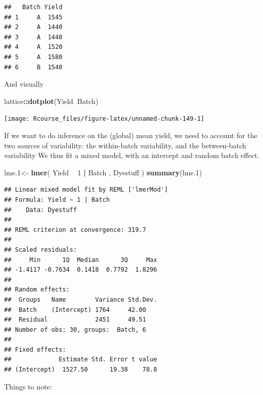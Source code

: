 \documentclass[]{book}
\newenvironment{Shaded}{\begin{snugshade}}{\end{snugshade}}
\newcommand{\KeywordTok}[1]{\textcolor[rgb]{0.13,0.29,0.53}{\textbf{#1}}}
\newcommand{\DecValTok}[1]{\textcolor[rgb]{0.00,0.00,0.81}{#1}}
\newcommand{\StringTok}[1]{\textcolor[rgb]{0.31,0.60,0.02}{#1}}
\newcommand{\OperatorTok}[1]{\textcolor[rgb]{0.81,0.36,0.00}{\textbf{#1}}}
\newcommand{\NormalTok}[1]{#1}
\theoremstyle{definition}
\theoremstyle{definition}
\theoremstyle{definition}
\theoremstyle{remark}
\begin{document}
\begin{verbatim}
##   Batch Yield
## 1     A  1545
## 2     A  1440
## 3     A  1440
## 4     A  1520
## 5     A  1580
## 6     B  1540
\end{verbatim}

And visually

\begin{Shaded}
\begin{Highlighting}[]
\NormalTok{lattice}\OperatorTok{::}\KeywordTok{dotplot}\NormalTok{(Yield}\OperatorTok{~}\NormalTok{Batch)}
\end{Highlighting}
\end{Shaded}

\texttt{[image: Rcourse\_files/figure-latex/unnamed-chunk-149-1]}

If we want to do inference on the (global) mean yield, we need to
account for the two sources of variability: the within-batch
variability, and the between-batch variability We thus fit a mixed
model, with an intercept and random batch effect.

\begin{Shaded}
\begin{Highlighting}[]
\NormalTok{lme.}\DecValTok{1}\NormalTok{<-}\StringTok{ }\KeywordTok{lmer}\NormalTok{( Yield }\OperatorTok{~}\StringTok{ }\DecValTok{1}  \OperatorTok{|}\StringTok{ }\NormalTok{Batch  , Dyestuff )}
\KeywordTok{summary}\NormalTok{(lme.}\DecValTok{1}\NormalTok{)}
\end{Highlighting}
\end{Shaded}

\begin{verbatim}
## Linear mixed model fit by REML ['lmerMod']
## Formula: Yield ~ 1 | Batch
##    Data: Dyestuff
## 
## REML criterion at convergence: 319.7
## 
## Scaled residuals: 
##     Min      1Q  Median      3Q     Max 
## -1.4117 -0.7634  0.1418  0.7792  1.8296 
## 
## Random effects:
##  Groups   Name        Variance Std.Dev.
##  Batch    (Intercept) 1764     42.00   
##  Residual             2451     49.51   
## Number of obs: 30, groups:  Batch, 6
## 
## Fixed effects:
##             Estimate Std. Error t value
## (Intercept)  1527.50      19.38    78.8
\end{verbatim}

Things to note:
\end{document}
